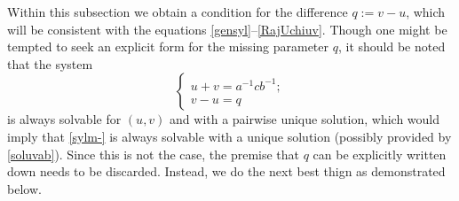 \documentclass{article}
\theoremstyle{definition}
\begin{document}
Within this subsection we obtain a condition for the difference $q:=v-u$, which will be consistent with the equations \eqref{gensyl}--\eqref{RajUchiuv}. Though one might be tempted to seek an explicit form for the missing parameter $q$, it should be noted that the system 
$$\begin{cases} u+v=a^{-1}cb^{-1};\\v-u=q\end{cases}$$
is always solvable for $(u,v)$ and with a pairwise unique solution, which would imply that \eqref{sylm-} is always solvable with a unique solution (possibly provided by \eqref{soluvab}). Since this is not the case, the premise that $q$ can be explicitly written down needs to be discarded. Instead, we do the next best thign as demonstrated below. \\
\end{document}
